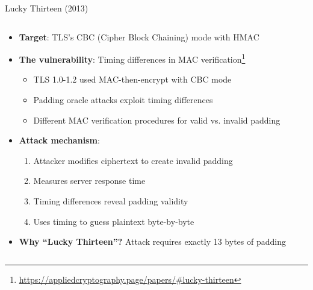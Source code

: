 \documentclass[aspectratio=169, lualatex, handout]{beamer}
\begin{document}
\begin{frame}{Lucky Thirteen (2013)}
	\begin{columns}[c]
		\begin{column}{1\textwidth}
			\begin{itemize}[<+->]
				\item \textbf{Target}: TLS's CBC (Cipher Block Chaining) mode with HMAC
				\item \textbf{The vulnerability}: Timing differences in MAC verification\footnote{\url{https://appliedcryptography.page/papers/\#lucky-thirteen}}
				      \begin{itemize}
					      \item TLS 1.0-1.2 used MAC-then-encrypt with CBC mode
					      \item Padding oracle attacks exploit timing differences
					      \item Different MAC verification procedures for valid vs. invalid padding
				      \end{itemize}
				\item \textbf{Attack mechanism}:
				      \begin{enumerate}
					      \item Attacker modifies ciphertext to create invalid padding
					      \item Measures server response time
					      \item Timing differences reveal padding validity
					      \item Uses timing to guess plaintext byte-by-byte
				      \end{enumerate}
				\item \textbf{Why ``Lucky Thirteen''?} Attack requires exactly 13 bytes of padding
			\end{itemize}
		\end{column}
	\end{columns}
\end{frame}
\end{document}
